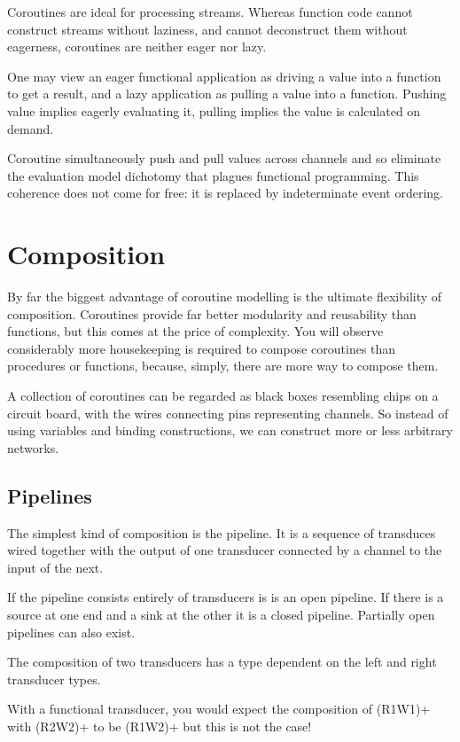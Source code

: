 \documentclass[oneside]{book}
\begin{document}
Coroutines are ideal for processing streams. Whereas
function code cannot construct streams without laziness,
and cannot deconstruct them without eagerness, coroutines
are neither eager nor lazy.

One may view an eager functional application as driving a
value into a function to get a result, and a lazy application
as pulling a value into a function. Pushing value implies
eagerly evaluating it, pulling implies the value is calculated
on demand.

Coroutine simultaneously push and pull values across channels
and so eliminate the evaluation model dichotomy that plagues
functional programming. This coherence does not come for
free: it is replaced by indeterminate event ordering.

\section{Composition}
By far the biggest advantage of coroutine modelling is the 
ultimate flexibility of composition. Coroutines provide
far better modularity and reusability than functions,
but this comes at the price of complexity. You will observe
considerably more housekeeping is required to compose
coroutines than procedures or functions, because, simply,
there are more way to compose them.

A collection of coroutines can be regarded as black boxes
resembling chips on a circuit board, with the wires
connecting pins representing channels. So instead of using
variables and binding constructions, we can construct more
or less arbitrary networks.

\subsection{Pipelines}
The simplest kind of composition is the pipeline. It is a sequence
of transduces wired together with the output of one transducer
connected by a channel to the input of the next.

If the pipeline consists entirely of transducers is is an open
pipeline. If there is a source at one end and a sink at the other
it is a closed pipeline. Partially open pipelines can also exist.

The composition of two transducers has a type dependent on
the left and right transducer types. 

With a functional transducer, you would expect the composition
of (R1W1)+ with (R2W2)+ to be (R1W2)+ but this is not the case!
\end{document}
